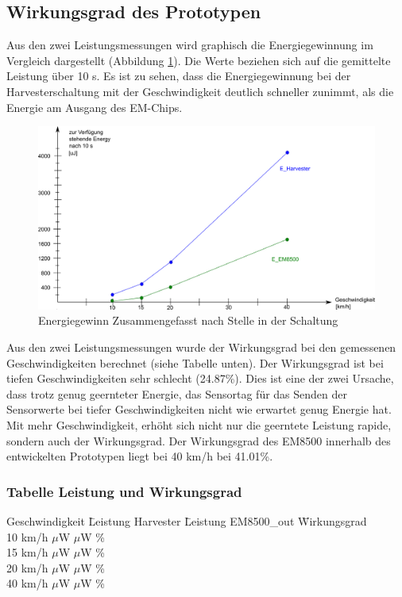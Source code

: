 \subsection{Wirkungsgrad des Prototypen}

Aus den zwei Leistungsmessungen wird graphisch die Energiegewinnung im Vergleich dargestellt (Abbildung \ref{zsmEnergyGewinn}). Die Werte beziehen sich auf die gemittelte Leistung über 10 s. Es ist zu sehen, dass die Energiegewinnung bei der Harvesterschaltung mit der Geschwindigkeit deutlich schneller zunimmt, als die Energie am Ausgang des EM-Chips. 

\begin{figure}[ht]
    \includegraphics[width=1\textwidth]{4Resultate/imag/EnergyGewinnNachStelle.png} 
    \caption{Energiegewinn Zusammengefasst nach Stelle in der Schaltung}
    \label{zsmEnergyGewinn}
\end{figure}

Aus den zwei Leistungsmessungen wurde der Wirkungsgrad bei den gemessenen Geschwindigkeiten berechnet (siehe Tabelle unten). Der Wirkungsgrad ist bei tiefen Geschwindigkeiten sehr schlecht (24.87\thinspace\%). Dies ist eine der zwei Ursache, dass trotz genug geernteter Energie, das Sensortag für das Senden der Sensorwerte bei tiefer Geschwindigkeiten nicht wie erwartet genug Energie hat. Mit mehr Geschwindigkeit, erhöht sich nicht nur die geerntete Leistung rapide, sondern auch der Wirkungsgrad. Der Wirkungsgrad des EM8500 innerhalb des entwickelten Prototypen liegt bei 40 km/h  bei 41.01\thinspace\%.  

\subsubsection*{Tabelle Leistung und Wirkungsgrad }
\begin{tabbing}
    Geschwindigkeit \quad\= Leistung Harvester \quad\= Leistung EM8500\_out \quad\= Wirkungsgrad\\[0.8ex]
    10 km/h    $\mu$W    $\mu$W \thinspace\%  \\
    15 km/h    $\mu$W   $\mu$W \thinspace\%  \\
    20 km/h  $\mu$W   $\mu$W \thinspace\%  \\
    40 km/h  $\mu$W  $\mu$W \thinspace\%  \\
\end{tabbing}   



